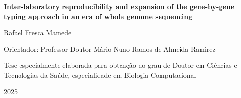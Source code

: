 \begin{titlepage}
\begin{center}
        \vspace{1cm}

        \huge
        \textbf{Inter-laboratory reproducibility and expansion of the gene-by-gene typing approach in an era of whole genome sequencing}
        \normalsize
        
        \vspace{1cm}
        
        \large
        Rafael Fresca Mamede
        \normalsize
        
        \vspace{1cm}
        
        Orientador: Professor Doutor Mário Nuno Ramos de Almeida Ramirez\\
        
        \vfill
        
        Tese especialmente elaborada para obtenção do grau de Doutor em Ciências e Tecnologias da Saúde, especialidade em Biologia Computacional\\
        
        \vspace{0.8cm}
        
        2025
        
    \end{center}
\end{titlepage}